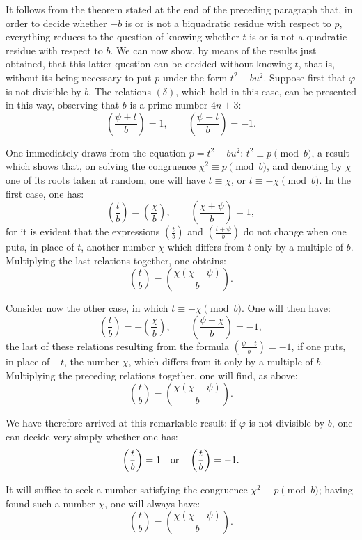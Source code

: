 \documentclass[11pt]{article}
\newcommand{\leg}[2]{\left(\frac{#1}{#2}\right)}
\newcommand{\unitid}[1]{\hypertarget{#1}{}}
\begin{document}
\unitid{dirichlet.v1.p04b.en.par.005}It follows from the theorem stated at the end of the preceding paragraph that, in order to decide whether $-b$ is or is not a biquadratic residue with respect to $p$, everything reduces to the question of knowing whether $t$ is or is not a quadratic residue with respect to $b$. We can now show, by means of the results just obtained, that this latter question can be decided without knowing $t$, that is, without its being necessary to put $p$ under the form $t^2-bu^2$. Suppose first that $\varphi$ is not divisible by $b$. The relations $(\delta)$, which hold in this case, can be presented in this way, observing that $b$ is a prime number $4n+3$:
\unitid{dirichlet.v1.p04b.en.eq.006}
\[
\leg{\psi+t}{b}=1,\qquad \leg{\psi-t}{b}=-1.
\]

\unitid{dirichlet.v1.p04b.en.par.006}One immediately draws from the equation $p=t^2-bu^2$: $t^2\equiv p\pmod b$, a result which shows that, on solving the congruence $\chi^2\equiv p\pmod b$, and denoting by $\chi$ one of its roots taken at random, one will have $t\equiv\chi$, or $t\equiv-\chi\pmod b$. In the first case, one has:
\unitid{dirichlet.v1.p04b.en.eq.007}
\[
\leg{t}{b}=\leg{\chi}{b},\qquad \leg{\chi+\psi}{b}=1,
\]
for it is evident that the expressions $\leg{t}{b}$ and $\leg{t+\psi}{b}$ do not change when one puts, in place of $t$, another number $\chi$ which differs from $t$ only by a multiple of $b$. Multiplying the last relations together, one obtains:
\unitid{dirichlet.v1.p04b.en.eq.008}
\[
\leg{t}{b}=\leg{\chi(\chi+\psi)}{b}.
\]

\unitid{dirichlet.v1.p04b.en.par.007}Consider now the other case, in which $t\equiv-\chi\pmod b$. One will then have:
\unitid{dirichlet.v1.p04b.en.eq.009}
\[
\leg{t}{b}=-\leg{\chi}{b},\qquad \leg{\psi+\chi}{b}=-1,
\]
the last of these relations resulting from the formula $\leg{\psi-t}{b}=-1$, if one puts, in place of $-t$, the number $\chi$, which differs from it only by a multiple of $b$. Multiplying the preceding relations together, one will find, as above:
\unitid{dirichlet.v1.p04b.en.eq.010}
\[
\leg{t}{b}=\leg{\chi(\chi+\psi)}{b}.
\]

\unitid{dirichlet.v1.p04b.en.par.008}We have therefore arrived at this remarkable result: if $\varphi$ is not divisible by $b$, one can decide very simply whether one has:
\unitid{dirichlet.v1.p04b.en.eq.011}
\[
\leg{t}{b}=1\quad\hbox{or}\quad \leg{t}{b}=-1.
\]

\unitid{dirichlet.v1.p04b.en.par.009}It will suffice to seek a number satisfying the congruence $\chi^2\equiv p\pmod b$; having found such a number $\chi$, one will always have:
\unitid{dirichlet.v1.p04b.en.eq.012}
\[
\leg{t}{b}=\leg{\chi(\chi+\psi)}{b}.
\]
\end{document}
